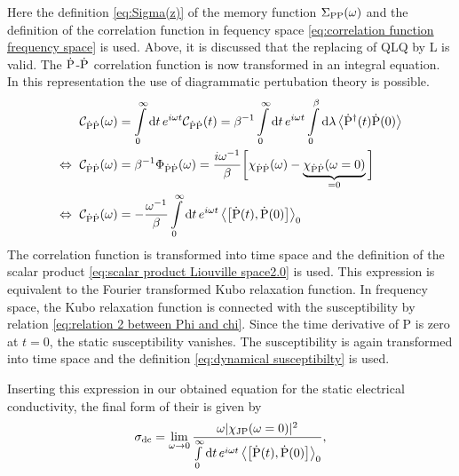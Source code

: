 %
Here the definition \eqref{eq:Sigma(z)} of the memory function $\Sigma_{\mathrm{PP}}(\omega)$ and the definition of the correlation function in fequency space \eqref{eq:correlation function frequency space} is used.
Above, it is discussed that the replacing of QLQ by L is valid.
The $\dot{\mathrm{P}}$-$\dot{\mathrm{P}}$ correlation function is now transformed in an integral equation.
In this representation the use of diagrammatic pertubation theory is possible.
%
\begin{align}
	\mathcal{C}_{\dot{\mt{P}} \dot{\mt{P}}}(\omega) &= \int\limits_{0}^{\infty} \dd{t} e^{i\omega t} \mathcal{C}_{\dot{\mt{P}} \dot{\mt{P}}}(t) = \beta^{-1} \int\limits_{0}^{\infty} \dd{t} e^{i\omega t} \int\limits_{0}^{\beta} \dd{\lambda} \expval{\dot{\mt{P}}^{\dag}(t) \dot{\mt{P}}(0)}
	\notag \\
	\Leftrightarrow\ \mathcal{C}_{\dot{\mt{P}} \dot{\mt{P}}}(\omega) &= \beta^{-1} \Phi_{\dot{\mt{P}} \dot{\mt{P}}}(\omega) = \frac{i\omega^{-1}}{\beta} \bigg[\chi_{\dot{\mt{P}} \dot{\mt{P}}}(\omega) - \underbrace{\chi_{\dot{\mt{P}} \dot{\mt{P}}}(\omega=0)}_{=0}\bigg]
	\notag \\
	\Leftrightarrow\ \mathcal{C}_{\dot{\mt{P}} \dot{\mt{P}}}(\omega) &= -\frac{\omega^{-1}}{\beta} \int\limits_{0}^{\infty} \dd{t} e^{i\omega t} \expval{\comm{\dot{\mt{P}}(t)}{\dot{\mt{P}}(0)}}_{0}
\end{align}
%
The correlation function is transformed into time space and the definition of the scalar product \eqref{eq:scalar product Liouville space2.0} is used.
This expression is equivalent to the Fourier transformed Kubo relaxation function.
In frequency space, the Kubo relaxation function is connected with the susceptibility by relation \eqref{eq:relation 2 between Phi and chi}.
Since the time derivative of P is zero at $t=0$, the static susceptibility vanishes.
The susceptibility is again transformed into time space and the definition \eqref{eq:dynamical susceptibilty} is used.

Inserting this expression in our obtained equation for the static electrical conductivity, the final form of their is given by
%
\begin{align}
	\sigma_{\mt{dc}} = \lim\limits_{\omega \to 0} \frac{\omega \vert \chi_{\mt{JP}}(\omega = 0) \vert^{2}}{\int\limits_{0}^{\infty} \dd{t} e^{i\omega t} \expval{\comm{\dot{\mt{P}}(t)}{\dot{\mt{P}}(0)}}_{0}},
	\label{eq:formula static conductivity}
\end{align}
%


































